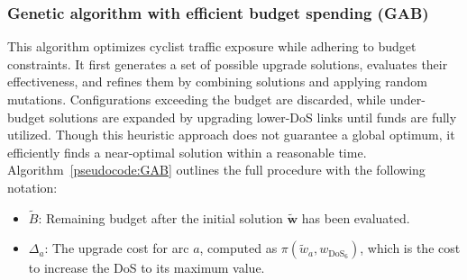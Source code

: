 \documentclass[letterpaper, 10 pt, conference]{ieeeconf}  %
\begin{document}
\subsubsection{Genetic algorithm with efficient budget spending (GAB)}
This algorithm optimizes cyclist traffic exposure while adhering to budget constraints. It first generates a set of possible upgrade solutions, evaluates their effectiveness, and refines them by combining solutions and applying random mutations. Configurations exceeding the budget are discarded, while under-budget solutions are expanded by upgrading lower-DoS links until funds are fully utilized. Though this heuristic approach does not guarantee a global optimum, it efficiently finds a near-optimal solution within a reasonable time. Algorithm~\ref{pseudocode:GAB} outlines the full procedure with the following notation:
\begin{itemize}
    \item $\tilde{B}$: Remaining budget after the initial solution $\tilde{\mathbf{w}}$ has been evaluated.
    \item $\Delta_a$: The upgrade cost for arc $a$, computed as $\pi(\tilde{w}_a, w_{\text{DoS}_6})$, which is the cost to increase the DoS to its maximum value.
\end{itemize}
\end{document}
